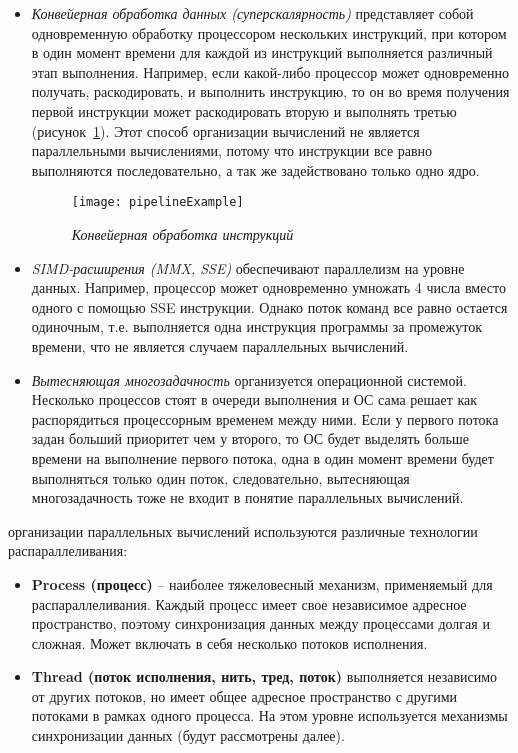 {		\begin{itemize}
			\item\textit{Конвейерная обработка данных (суперскалярность)} представляет собой одновременную обработку процессором нескольких инструкций, при котором в один момент времени для каждой из инструкций выполняется различный этап выполнения. Например, если какой-либо процессор может одновременно получать, раскодировать, и выполнить инструкцию, то он во время получения первой инструкции может раскодировать вторую и выполнять третью (рисунок~\ref{pipelineExample:image}). Этот способ организации вычислений не является параллельными вычислениями, потому что инструкции все равно выполняются последовательно, а так же задействовано только одно ядро.
				\begin{figure}[H]
					\texttt{[image: pipelineExample]}
					\caption{\textit{Конвейерная обработка инструкций}}
					\label{pipelineExample:image}
				\end{figure}
			\item\textit{SIMD-расширения (MMX, SSE)} обеспечивают параллелизм на уровне данных. Например, процессор может одновременно умножать 4 числа вместо одного с помощью SSE инструкции. Однако поток команд все равно остается одиночным, т.е. выполняется одна инструкция программы за промежуток времени, что не является случаем параллельных вычислений.
			\item\textit{Вытесняющая многозадачность} организуется операционной системой. Несколько процессов стоят в очереди выполнения и ОС сама решает как распорядиться процессорным временем между ними. Если у первого потока задан больший приоритет чем у второго, то ОС будет выделять больше времени на выполнение первого потока, одна в один момент времени будет выполняться только один поток, следовательно, вытесняющая многозадачность тоже не входит в понятие параллельных вычислений.
		\end{itemize}
	 организации параллельных вычислений используются различные технологии распараллеливания:
		\begin{itemize}
			\item\textbf{Process (процесс)} -- наиболее тяжеловесный механизм, применяемый для распараллеливания. Каждый процесс имеет свое независимое адресное пространство, поэтому синхронизация данных между процессами долгая и сложная. Может включать в себя несколько потоков исполнения.
			\item\textbf{Thread (поток исполнения, нить, тред, поток)} выполняется независимо от других потоков, но имеет общее адресное пространство с другими потоками в рамках одного процесса. На этом уровне используется механизмы синхронизации данных (будут рассмотрены далее).

\end{itemize}}
